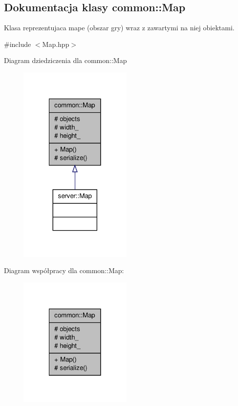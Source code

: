 \hypertarget{classcommon_1_1Map}{\subsection{Dokumentacja klasy common\-:\-:Map}
\label{classcommon_1_1Map}
}


Klasa reprezentujaca mape (obszar gry) wraz z zawartymi na niej obiektami.  




{\ttfamily \#include $<$Map.\-hpp$>$}



Diagram dziedziczenia dla common\-:\-:Map
\nopagebreak
\begin{figure}[H]
\begin{center}
\leavevmode
\includegraphics[width=158pt]{classcommon_1_1Map__inherit__graph}
\end{center}
\end{figure}


Diagram współpracy dla common\-:\-:Map\-:
\nopagebreak
\begin{figure}[H]
\begin{center}
\leavevmode
\includegraphics[width=158pt]{classcommon_1_1Map__coll__graph}
\end{center}
\end{figure}
